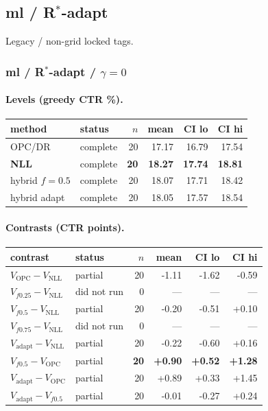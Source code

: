 \documentclass[10pt,a4paper]{article}
\begin{document}
\subsection{ml / R$^*$-adapt}
Legacy / non-grid locked tags.
\subsubsection{ml / R$^*$-adapt / $\gamma=0$}
\paragraph{Levels (greedy CTR \%).}
{\centering\small\begin{tabular}{llrrrr}
\toprule method & status & $n$ & mean & CI lo & CI hi \\
\midrule
OPC/DR & complete & 20 & 17.17 & 16.79 & 17.54 \\
\textbf{NLL} & complete & \textbf{20} & \textbf{18.27} & \textbf{17.74} & \textbf{18.81} \\
hybrid $f{=}0.5$ & complete & 20 & 18.07 & 17.71 & 18.42 \\
hybrid adapt & complete & 20 & 18.05 & 17.57 & 18.54 \\
\bottomrule\end{tabular}\par}
\paragraph{Contrasts (CTR points).}
{\centering\small\begin{tabular}{llrrrr}
\toprule contrast & status & $n$ & mean & CI lo & CI hi \\
\midrule
$V_{\mathrm{OPC}}-V_{\mathrm{NLL}}$ & partial & 20 & -1.11 & -1.62 & -0.59 \\
$V_{f0.25}-V_{\mathrm{NLL}}$ & did not run & 0 & --- & --- & --- \\
$V_{f0.5}-V_{\mathrm{NLL}}$ & partial & 20 & -0.20 & -0.51 & +0.10 \\
$V_{f0.75}-V_{\mathrm{NLL}}$ & did not run & 0 & --- & --- & --- \\
$V_{\mathrm{adapt}}-V_{\mathrm{NLL}}$ & partial & 20 & -0.22 & -0.60 & +0.16 \\
\textbf{$V_{f0.5}-V_{\mathrm{OPC}}$} & partial & \textbf{20} & \textbf{+0.90} & \textbf{+0.52} & \textbf{+1.28} \\
$V_{\mathrm{adapt}}-V_{\mathrm{OPC}}$ & partial & 20 & +0.89 & +0.33 & +1.45 \\
$V_{\mathrm{adapt}}-V_{f0.5}$ & partial & 20 & -0.01 & -0.27 & +0.24 \\
\bottomrule\end{tabular}\par}
\bigskip
\end{document}
